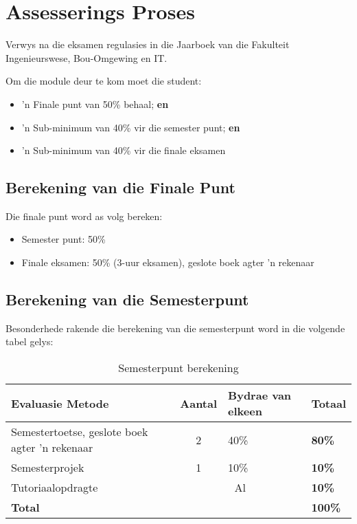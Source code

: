 \section{Assesserings Proses}
    Verwys na die eksamen regulasies in die Jaarboek van die Fakulteit
    Ingenieurswese, Bou-Omgewing en IT.

    Om die module deur te kom moet die student:
    \begin{itemize}
        \item 'n Finale punt van 50\% behaal; {\bf en}
        \item 'n Sub-minimum van 40\% vir die semester punt; {\bf en}
        \item 'n Sub-minimum van 40\% vir die finale eksamen
    \end{itemize}

    \subsection{Berekening van die Finale Punt}
        Die finale punt word as volg bereken:
        \begin{itemize}
            \item Semester punt: 50\%
            \item Finale eksamen: 50\% (3-uur eksamen), geslote boek
              agter 'n rekenaar
        \end{itemize}

    \subsection{Berekening van die Semesterpunt}
        Besonderhede rakende die berekening van die semesterpunt word in die
        volgende tabel gelys:
        \begin{table}[!h]
            \begin{center}
             \begin{tabular}{|p{5cm}|c|l|l|}
               \hline
               {\bf Evaluasie Metode} & {\bf Aantal} & 
               {\bf Bydrae van elkeen} & {\bf Totaal} \\
               \hline
               Semestertoetse, geslote boek
               agter 'n rekenaar
               & 2 & 40\% & {\bf 80\%} \\ \hline
               Semesterprojek
               & 1 & 10\% & {\bf 10\%} \\ \hline
               Tutoriaalopdragte
               & \multicolumn{2}{|c|}{Al} & {\bf 10\%} \\
               \hline
               \multicolumn{3}{|l|}{{\bf Total}} & {\bf 100\%} \\
               \hline
             \end{tabular}
             \caption{Semesterpunt berekening}
            \end{center}
        \end{table}


